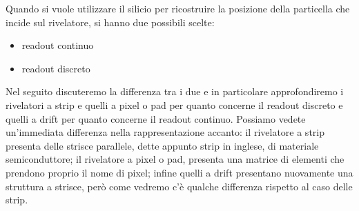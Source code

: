 \begin{minipage}{0.6\textwidth}
   Quando si vuole utilizzare il silicio per ricostruire la posizione della particella che incide sul rivelatore, si hanno due possibili scelte:
   \begin{itemize}[leftmargin=0.5cm]
      \item readout continuo
      \item readout discreto
   \end{itemize}
   Nel seguito discuteremo la differenza tra i due e in particolare approfondiremo i rivelatori a strip e quelli a pixel o pad per quanto concerne il readout discreto e quelli a drift per quanto concerne il readout continuo. Possiamo vedete un'immediata differenza nella rappresentazione accanto: il rivelatore a strip presenta delle strisce parallele, dette appunto strip in inglese, di materiale semiconduttore; il rivelatore a pixel o pad, presenta una matrice di elementi che prendono proprio il nome di pixel; infine quelli a drift presentano nuovamente una struttura a strisce, però come vedremo c'è qualche differenza rispetto al caso delle strip.
\end{minipage}

